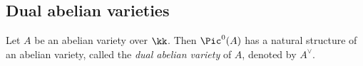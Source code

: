 \subsection{Dual abelian varieties}

    \begin{theorem}\label{thm: dual abelian varieties}
        Let $A$ be an abelian variety over $\kk$. 
        Then \(\Pic^0(A) \) has a natural structure of an abelian variety, called the \emph{dual abelian variety} of $A$, denoted by $A^\vee$.
    \end{theorem}

    \begin{proposition}\label{prop: the Poincare line bundle}
        
    \end{proposition}